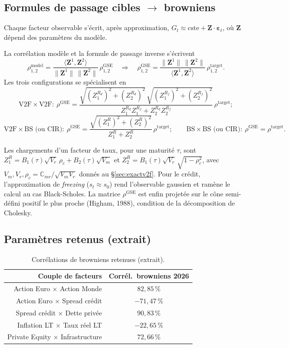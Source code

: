 \documentclass[11pt,a4paper]{article}
\newcommand{\tablehead}[1]{{\sffamily\bfseries\color{nxnavy}#1}}
\begin{document}
\subsection{Formules de passage cibles \texorpdfstring{$\to$}{->} browniens}
Chaque facteur observable s'écrit, après approximation, $G_t\approx\text{cste}+\bm Z\cdot\bm\varepsilon_t$, où $\bm Z$ dépend des paramètres du modèle.
\begin{definitionbox}
La corrélation modèle et la formule de passage inverse s'écrivent
\[
\rho^{\mathrm{model}}_{1,2}=\frac{\langle\bm Z^1,\bm Z^2\rangle}{\lVert\bm Z^1\rVert\,\lVert\bm Z^2\rVert}\,\rho^{\mathrm{GSE}}_{1,2}
\quad\Longrightarrow\quad
\rho^{\mathrm{GSE}}_{1,2}=\frac{\lVert\bm Z^1\rVert\,\lVert\bm Z^2\rVert}{\langle\bm Z^1,\bm Z^2\rangle}\,\rho^{\mathrm{target}}_{1,2}.
\]
Les trois configurations se spécialisent en
\[
\text{V2F}\!\times\!\text{V2F}:\ \rho^{\mathrm{GSE}}=\frac{\sqrt{(Z_1^{R_d})^2+(Z_2^{R_d})^2}\,\sqrt{(Z_1^{R_f})^2+(Z_2^{R_f})^2}}{Z_1^{R_d}Z_1^{R_f}+Z_2^{R_d}Z_2^{R_f}}\,\rho^{\mathrm{target}};
\]
\[
\text{V2F}\!\times\!\text{BS (ou CIR)}:\ \rho^{\mathrm{GSE}}=\frac{\sqrt{(Z_1^{R})^2+(Z_2^{R})^2}}{Z_1^{R}+Z_2^{R}}\,\rho^{\mathrm{target}};
\qquad
\text{BS}\!\times\!\text{BS (ou CIR)}:\ \rho^{\mathrm{GSE}}=\rho^{\mathrm{target}}.
\]
\end{definitionbox}
Les chargements d'un facteur de taux, pour une maturité $\tau$, sont $Z_1^{R}=B_1(\tau)\sqrt{V_r}\,\rho_c+B_2(\tau)\sqrt{V_m}$ et $Z_2^{R}=B_1(\tau)\sqrt{V_r}\,\sqrt{1-\rho_c^2}$, avec $V_m,V_r,\rho_c=\mathbb C_{mr}/\sqrt{V_m V_r}$ donnés au \S\ref{sec:exactv2f}. Pour le crédit, l'approximation de \emph{freezing} ($s_t\approx s_0$) rend l'observable gaussien et ramène le calcul au cas Black-Scholes. La matrice $\rho^{\mathrm{GSE}}$ est enfin projetée sur le cône semi-défini positif le plus proche (Higham, 1988), condition de la décomposition de Cholesky.

\subsection{Paramètres retenus (extrait)}
\begin{table}[H]
\centering\small
\renewcommand{\arraystretch}{1.4}\setlength{\tabcolsep}{6pt}
\begin{tabularx}{\linewidth}{R c}
\toprule
\tablehead{Couple de facteurs} & \tablehead{Corrél.\ browniens 2026} \\
\midrule
{} Action Euro $\times$ Action Monde & $82{,}85\,\%$ \\
Action Euro $\times$ Spread crédit & $-71{,}47\,\%$ \\
 Spread crédit $\times$ Dette privée & $90{,}83\,\%$ \\
Inflation LT $\times$ Taux réel LT & $-22{,}65\,\%$ \\
 Private Equity $\times$ Infrastructure & $72{,}66\,\%$ \\
\bottomrule
\end{tabularx}
\caption{Corrélations de browniens retenues (extrait).}
\end{table}
\end{document}

